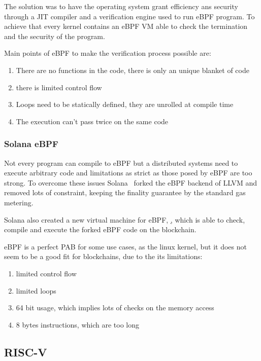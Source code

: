 \documentclass[../main.tex]{subfiles}
\begin{document}
The solution was to have the operating system grant efficiency ans security through a JIT compiler and a verification engine used to run eBPF program. To achieve that every kernel contains an eBPF VM able to check the termination and the security of the program.

Main points of eBPF to make the verification process possible are:~\cite{ebpf}
\begin{enumerate}
  \item There are no functions in the code, there is only an unique blanket of code
  \item there is limited control flow
  \item Loops need to be statically defined, they are unrolled at compile time
  \item The execution can't pass twice on the same code
\end{enumerate}

\subsubsection{Solana eBPF}

Not every program can compile to eBPF but a distributed systems need to execute arbitrary code and limitations as strict as those posed by eBPF are too strong. To overcome these issues Solana~\cite{yakovenko2018solana} forked the eBPF backend of LLVM and removed lots of constraint, keeping the finality guarantee by the standard gas metering.~\cite{ebpf-contracts}


Solana also created a new virtual machine for eBPF, \href{https://github.com/qmonnet/rbpf}, which is able to check, compile and execute the forked eBPF code on the blockchain.

eBPF is a perfect PAB for some use cases, as the linux kernel, but it does not seem to be a good fit for blockchains, due to the its limitations:
\begin{enumerate}
  \item limited control flow
  \item limited loops
  \item 64 bit usage, which implies lots of checks on the memory access
  \item 8 bytes instructions, which are too long
\end{enumerate}

\subsection{RISC-V}
\end{document}

